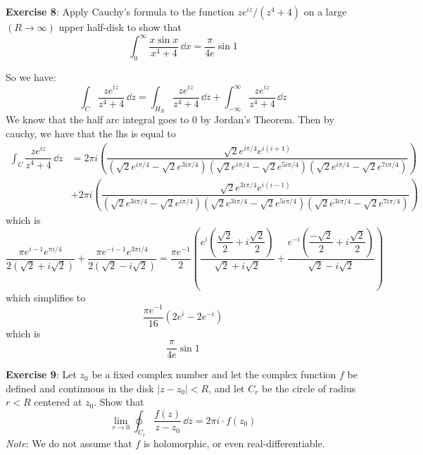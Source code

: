 \documentclass{article}
\begin{document}
\textbf{Exercise 8}: Apply Cauchy's formula to the function $ze^{iz}/(z^{4} + 4)$ on a large $(R \rightarrow \infty)$ upper half-disk to show that 
    \begin{equation*}
        \int_{0}^{\infty} \dfrac{x\sin{x}}{x^{4} + 4} \, \dd{x} = \dfrac{\pi}{4e}\sin{1}
    \end{equation*}
    \begin{answer}
        So we have:
            \begin{equation*}
                \int_{C}^{} \dfrac{ze^{iz}}{z^{4} + 4} \, \dd{z}  = \int_{H_{R}}^{} \dfrac{ze^{iz}}{z^{4} + 4} \, \dd{z}  + \int_{-\infty}^{\infty} \dfrac{ze^{iz}}{z^{4} + 4} \, \dd{z} 
            \end{equation*}
        We know that the half arc integral goes to $0$ by Jordan's Theorem. Then by cauchy, we have that the lhs is equal to 
            \begin{align*}
                \int_{C}^{} \dfrac{ze^{iz}}{z^{4} + 4} \, \dd{z}  &= 2\pi i (\dfrac{\sqrt{2}e^{i\pi/4}e^{i(i + 1)}}{(\sqrt{2}e^{i\pi/4} - \sqrt{2}e^{3i\pi/4})(\sqrt{2}e^{i\pi/4} - \sqrt{2}e^{5i\pi/4})(\sqrt{2}e^{i\pi/4} - \sqrt{2}e^{7i\pi/4})}) \\
                &+ 2\pi i (\dfrac{\sqrt{2}e^{3i\pi/4} e^{i(i - 1)}}{(\sqrt{2}e^{3i\pi/4} - \sqrt{2}e^{i\pi/4})(\sqrt{2}e^{3i\pi/4} - \sqrt{2}e^{5i\pi/4})(\sqrt{2}e^{3i\pi/4} - \sqrt{2}e^{7i\pi/4})}) 
            \end{align*}
        which is 
            \begin{equation*}
                \dfrac{\pi e^{i - 1}e^{\pi i /4}}{2(\sqrt{2} + i\sqrt{2})} + \dfrac{\pi e^{-i - 1} e^{3\pi i /4}}{2(\sqrt{2} - i\sqrt{2})} = \dfrac{\pi e^{-1}}{2}\left(\dfrac{e^{i}\left(\dfrac{\sqrt{2}}{2} + i\dfrac{\sqrt{2}}{2}\right)}{\sqrt{2} + i\sqrt{2}} + \dfrac{e^{-i} \left(\dfrac{-\sqrt{2}}{2} + i\dfrac{\sqrt{2}}{2}\right)}{\sqrt{2} - i\sqrt{2}}\right)
            \end{equation*}
        which simplifies to
            \begin{equation*}
                \dfrac{\pi e^{-1}}{16}\left(2e^{i} - 2e^{-i}\right)
            \end{equation*}
        which is
            \begin{equation*}
                \dfrac{\pi}{4e} \sin{1}
            \end{equation*}
    \end{answer}

\newpage

\textbf{Exercise 9}: Let $z_{0}$ be a fixed complex number and let the complex function $f$ be defined and continuous in the disk $\lvert z - z_{0} \rvert < R$, and let $C_{r}$ be the circle of radius $r < R$ centered at $z_{0}$. Show that 
    \begin{equation*}
        \lim\limits_{r \to 0} \oint_{C_{r}}^{} \dfrac{f(z)}{z - z_{0}} \, \dd{z}  = 2\pi i \cdot f(z_{0})
    \end{equation*}
\textit{Note}: We do not assume that $f$ is holomorphic, or even real-differentiable.
\end{document}
